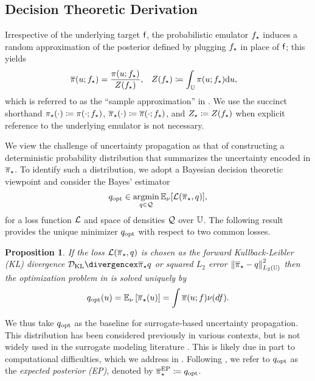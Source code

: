 \documentclass[12pt]{article}
\newtheorem{prop}{Proposition}
\begin{document}
\subsection{Decision Theoretic Derivation} \label{sec:decision-theoretic}
Irrespective of the underlying target $\mathsf{f}$, the probabilistic emulator ${f}_{\star}$ 
induces a random approximation of the posterior defined by plugging ${f}_{\star}$
in place of $\mathsf{f}$; this yields
\begin{align}
\postDensNorm(\Par; \targetEm) 
&= \frac{\postDens(\Par; \targetEm)}{\normCst(\targetEm)},
&&\normCst(\targetEm) \Def \int_{\parSpace} \postDens(\Par; \targetEm) \d\Par, \label{eq:random-post}
\end{align}
which is referred to as the ``sample approximation'' in \citet{StuartTeck1}. We use the succinct
shorthand ${\pi}_{\star}(\cdot) \coloneqq \pi(\cdot; {f}_{\star})$, 
${\overline{\pi}}_{\star}(\cdot) \coloneqq \overline{\pi}(\cdot; {f}_{\star})$, and 
${Z}_{\star} \coloneqq Z({f}_{\star})$ when explicit reference to the underlying 
emulator is not necessary.

We view the challenge of uncertainty propagation as that of constructing a deterministic 
probability distribution that summarizes the uncertainty encoded in ${\overline{\pi}}_{\star}$.
To identify such a distribution, we adopt a Bayesian decision theoretic viewpoint and consider
the Bayes' estimator
\begin{equation}
q_{\mathrm{opt}} \in \operatorname*{argmin}_{q \in \mathcal{Q}} \mathbb{E}_{\nu}[\mathcal{L}({\overline{\pi}}_{\star}, q)],
\label{eq:variational-opt}
\end{equation}
for a loss function $\mathcal{L}$ and space of densities $\mathcal{Q}$ over $\mathbb{U}$. The following 
result provides the unique minimizer $q_{\mathrm{opt}}$ with respect to two common losses.

\begin{prop} \label{prop:EP-variational}
If the loss $\mathcal{L}({\overline{\pi}}_{\star}, q)$ is chosen as the forward Kullback-Leibler (KL) divergence 
$\KL{\postNormEm}{q}$ or squared $L_2$ error $\left\lVert{\overline{\pi}}_{\star} - q\right\rVert_{L_2(\mathbb{U})}^2$
then the optimization problem in  is solved uniquely by 
\begin{equation}
q_{\mathrm{opt}}(u) = 
\mathbb{E}_{\nu} \left[{\overline{\pi}}_{\star}(u) \right]
= \int \overline{\pi}(u; f) \nu(df).
\label{eq:ep-approx}
\end{equation}
\end{prop}

We thus take $q_{\mathrm{opt}}$ as the baseline for surrogate-based uncertainty propagation. 
This distribution has been considered previously in various 
contexts, but is not widely used in the surrogate modeling literature
\citep{trainDynamics,BurknerSurrogate,garegnani2021NoisyMCMC}.
This is likely due in part to computational difficulties, which we address in .
Following \citet{BurknerSurrogate}, we refer to $q_{\mathrm{opt}}$ as the \textit{expected posterior (EP)},
denoted by ${\overline{\pi}}_{\star}^{\mathrm{EP}} \coloneqq q_{\mathrm{opt}}$.
\end{document}
